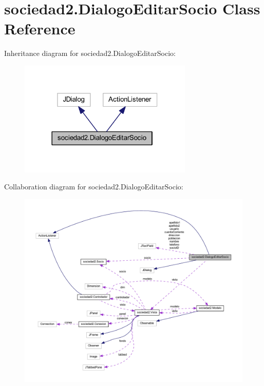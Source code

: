 \hypertarget{classsociedad2_1_1_dialogo_editar_socio}{}\section{sociedad2.\+Dialogo\+Editar\+Socio Class Reference}
\label{classsociedad2_1_1_dialogo_editar_socio}


Inheritance diagram for sociedad2.\+Dialogo\+Editar\+Socio\+:\nopagebreak
\begin{figure}[H]
\begin{center}
\leavevmode
\includegraphics[width=234pt]{classsociedad2_1_1_dialogo_editar_socio__inherit__graph}
\end{center}
\end{figure}


Collaboration diagram for sociedad2.\+Dialogo\+Editar\+Socio\+:
\nopagebreak
\begin{figure}[H]
\begin{center}
\leavevmode
\includegraphics[width=350pt]{classsociedad2_1_1_dialogo_editar_socio__coll__graph}
\end{center}
\end{figure}
